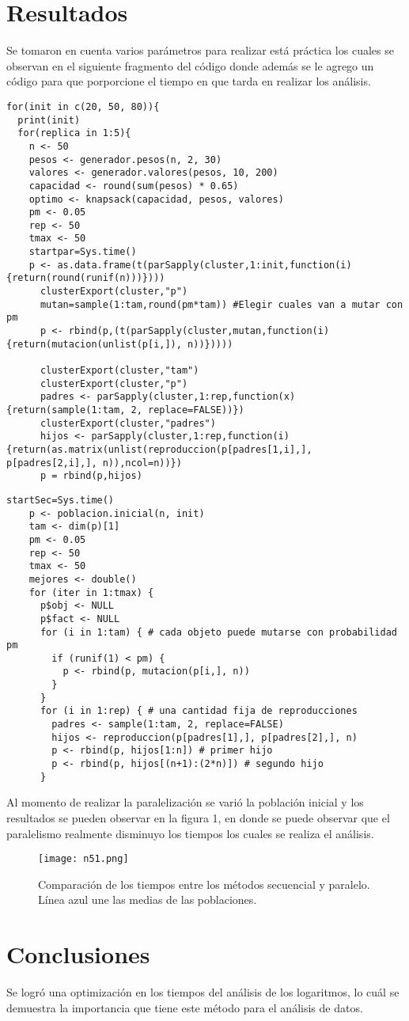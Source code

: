 \documentclass{article}
\begin{document}
\section{Resultados}
Se tomaron en cuenta varios parámetros para realizar está práctica los cuales se observan en el siguiente fragmento del código donde además se le agrego un código para que porporcione el tiempo en que tarda en realizar los análisis.
\begin{lstlisting}[frame=single]
for(init in c(20, 50, 80)){
  print(init)
  for(replica in 1:5){
    n <- 50
    pesos <- generador.pesos(n, 2, 30)
    valores <- generador.valores(pesos, 10, 200)
    capacidad <- round(sum(pesos) * 0.65)
    optimo <- knapsack(capacidad, pesos, valores)
    pm <- 0.05    
    rep <- 50
    tmax <- 50
    startpar=Sys.time()
    p <- as.data.frame(t(parSapply(cluster,1:init,function(i){return(round(runif(n)))})))
      clusterExport(cluster,"p")
      mutan=sample(1:tam,round(pm*tam)) #Elegir cuales van a mutar con pm
      p <- rbind(p,(t(parSapply(cluster,mutan,function(i){return(mutacion(unlist(p[i,]), n))}))))
      
      clusterExport(cluster,"tam")
      clusterExport(cluster,"p") 
      padres <- parSapply(cluster,1:rep,function(x){return(sample(1:tam, 2, replace=FALSE))}) 
      clusterExport(cluster,"padres")
      hijos <- parSapply(cluster,1:rep,function(i){return(as.matrix(unlist(reproduccion(p[padres[1,i],], p[padres[2,i],], n)),ncol=n))})
      p = rbind(p,hijos)
\end{lstlisting}
\begin{lstlisting}[frame=single]
startSec=Sys.time()
    p <- poblacion.inicial(n, init)
    tam <- dim(p)[1]
    pm <- 0.05
    rep <- 50
    tmax <- 50
    mejores <- double()
    for (iter in 1:tmax) {
      p$obj <- NULL
      p$fact <- NULL
      for (i in 1:tam) { # cada objeto puede mutarse con probabilidad pm
        if (runif(1) < pm) {
          p <- rbind(p, mutacion(p[i,], n))
        }
      }
      for (i in 1:rep) { # una cantidad fija de reproducciones
        padres <- sample(1:tam, 2, replace=FALSE)
        hijos <- reproduccion(p[padres[1],], p[padres[2],], n)
        p <- rbind(p, hijos[1:n]) # primer hijo
        p <- rbind(p, hijos[(n+1):(2*n)]) # segundo hijo
      }
\end{lstlisting}
Al momento de realizar la paralelización se varió la población inicial y los resultados se pueden observar en la figura 1, en donde se puede observar que el paralelismo realmente disminuyo los tiempos los cuales se realiza el análisis. 
\begin{figure}[H]
\centering
\texttt{[image: n51.png]}
\caption{Comparación de los tiempos entre los métodos secuencial y paralelo. Línea azul une las medias de las poblaciones.}
\end{figure}



\section{Conclusiones}
Se logró una optimización en los tiempos del análisis de los logaritmos, lo cuál se demuestra la importancia que tiene este método para el análisis de datos.


\end{document}
